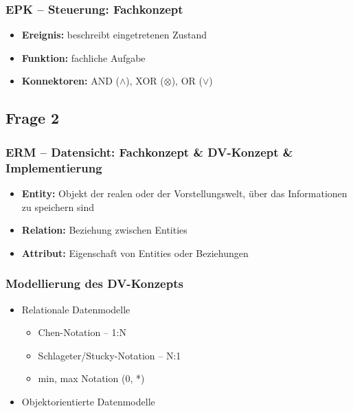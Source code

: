 \documentclass[a4paper]{article}
\begin{document}
			\bigskip
			
			\subsubsection{EPK -- Steuerung: Fachkonzept}
			\begin{itemize}
				\item \textbf{Ereignis:} beschreibt eingetretenen Zustand
				\item \textbf{Funktion:} fachliche Aufgabe
				\item \textbf{Konnektoren:} AND ($\land$), XOR ($\otimes$), OR ($\lor$)
			\end{itemize}
			
			\pagebreak
			
			\subsection{Frage 2}
			\label{le4-2}
			\subsubsection{ERM -- Datensicht: Fachkonzept \& DV-Konzept \& Implementierung}
			\begin{itemize}
				\item \textbf{Entity:} Objekt der realen oder der Vorstellungswelt, über das Informationen zu speichern sind
				\item \textbf{Relation:} Beziehung zwischen Entities
				\item \textbf{Attribut:} Eigenschaft von Entities oder Beziehungen
			\end{itemize}
			
			\subsubsection{Modellierung des DV-Konzepts}
			\begin{itemize}
				\item Relationale Datenmodelle
				\begin{itemize}
					\item Chen-Notation -- 1:N
					\item Schlageter/Stucky-Notation -- N:1
					\item min, max Notation (0, *)
				\end{itemize}
				\item Objektorientierte Datenmodelle
			\end{itemize}
			
\end{document}
